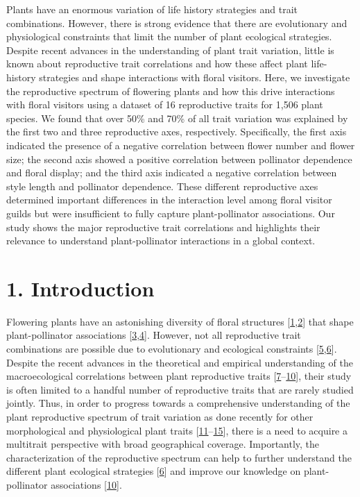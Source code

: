 \documentclass[
  12pt,
  a4paper,
]{article}
\begin{document}
Plants have an enormous variation of life history strategies and trait combinations. However, there is strong evidence that there are evolutionary and physiological constraints that limit the number of plant ecological strategies. Despite recent advances in the understanding of plant trait variation, little is known about reproductive trait correlations and how these affect plant life-history strategies and shape interactions with floral visitors. Here, we investigate the reproductive spectrum of flowering plants and how this drive interactions with floral visitors using a dataset of 16 reproductive traits for 1,506 plant species. We found that over 50\% and 70\% of all trait variation was explained by the first two and three reproductive axes, respectively. Specifically, the first axis indicated the presence of a negative correlation between flower number and flower size; the second axis showed a positive correlation between pollinator dependence and floral display; and the third axis indicated a negative correlation between style length and pollinator dependence. These different reproductive axes determined important differences in the interaction level among floral visitor guilds but were insufficient to fully capture plant-pollinator associations. Our study shows the major reproductive trait correlations and highlights their relevance to understand plant-pollinator interactions in a global context.

\doublespacing
\vspace{5mm}
\normalsize

\hypertarget{introduction}{%
\section{1. Introduction}\label{introduction}}

Flowering plants have an astonishing diversity of floral structures {[}\protect\hyperlink{ref-barrett2002}{1},\protect\hyperlink{ref-schiestl2013}{2}{]} that shape plant-pollinator associations {[}\protect\hyperlink{ref-fenster2004}{3},\protect\hyperlink{ref-dellinger2020}{4}{]}. However, not all reproductive trait combinations are possible due to evolutionary and ecological constraints {[}\protect\hyperlink{ref-stearns1989}{5},\protect\hyperlink{ref-agrawal2020}{6}{]}. Despite the recent advances in the theoretical and empirical understanding of the macroecological correlations between plant reproductive traits {[}\protect\hyperlink{ref-salguero2016}{7}--\protect\hyperlink{ref-roddy2021}{10}{]}, their study is often limited to a handful number of reproductive traits that are rarely studied jointly. Thus, in order to progress towards a comprehensive understanding of the plant reproductive spectrum of trait variation as done recently for other morphological and physiological plant traits {[}\protect\hyperlink{ref-wright2004}{11}--\protect\hyperlink{ref-laughlin2021}{15}{]}, there is a need to acquire a multitrait perspective with broad geographical coverage. Importantly, the characterization of the reproductive spectrum can help to further understand the different plant ecological strategies {[}\protect\hyperlink{ref-agrawal2020}{6}{]} and improve our knowledge on plant-pollinator associations {[}\protect\hyperlink{ref-roddy2021}{10}{]}.
\end{document}
